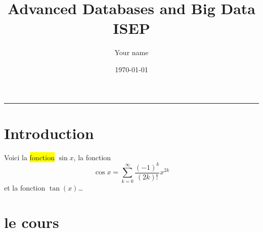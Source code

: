 \documentclass[12pt, oneside]{article}
\title{Advanced Databases and Big Data \\  ISEP}
\author{Your name}
\date{\today}
\begin{document}
\maketitle
\hrule height 0.5mm


\section{Introduction}

Voici la \colorbox{yellow}{fonction} $\sin x$,
la fonction \[\cos x=\sum_{k=0}^{\infty}\frac{(-1)^k}{(2k)!}x^{2k}\]
et la fonction $\tan (x)$\ldots
  
\section{le cours}
\end{document}
